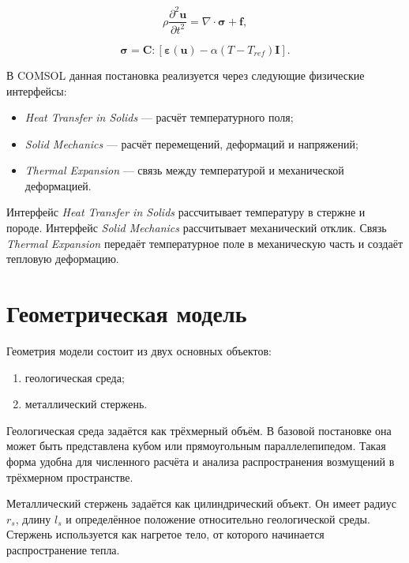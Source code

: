 \begin{equation}
\rho\frac{\partial^2\mathbf{u}}{\partial t^2}=\nabla\cdot\boldsymbol{\sigma}+\mathbf{f},
\end{equation}

\begin{equation}
\boldsymbol{\sigma}=\mathbf{C}:\left[\boldsymbol{\varepsilon}(\mathbf{u})-\alpha(T-T_{ref})\mathbf{I}\right].
\end{equation}

В COMSOL данная постановка реализуется через следующие физические интерфейсы:

\begin{itemize}
    \item \textit{Heat Transfer in Solids} --- расчёт температурного поля;
    \item \textit{Solid Mechanics} --- расчёт перемещений, деформаций и напряжений;
    \item \textit{Thermal Expansion} --- связь между температурой и механической деформацией.
\end{itemize}

Интерфейс \textit{Heat Transfer in Solids} рассчитывает температуру в стержне и породе. Интерфейс \textit{Solid Mechanics} рассчитывает механический отклик. Связь \textit{Thermal Expansion} передаёт температурное поле в механическую часть и создаёт тепловую деформацию.

\section{Геометрическая модель}

Геометрия модели состоит из двух основных объектов:

\begin{enumerate}
    \item геологическая среда;
    \item металлический стержень.
\end{enumerate}

Геологическая среда задаётся как трёхмерный объём. В базовой постановке она может быть представлена кубом или прямоугольным параллелепипедом. Такая форма удобна для численного расчёта и анализа распространения возмущений в трёхмерном пространстве.

Металлический стержень задаётся как цилиндрический объект. Он имеет радиус $r_s$, длину $l_s$ и определённое положение относительно геологической среды. Стержень используется как нагретое тело, от которого начинается распространение тепла.

